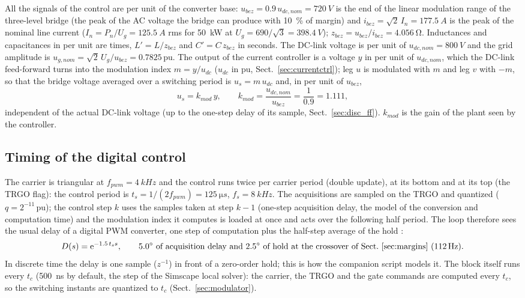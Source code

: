 \documentclass[10pt,a4paper]{scrartcl}
\newcommand{\ts}{t_s}
\newcommand{\tc}{t_c}
\newcommand{\kmod}{k_{mod}}
\newcommand{\ee}{\mathrm{e}}
\newcommand{\pu}{\,\mathrm{pu}}
\begin{document}
\begin{onehalfspace}
All the signals of the control are per unit of the converter base: $u_{bez} = 0.9\,u_{dc,nom} = \SI{720}{V}$ is the end of the linear modulation range of the three-level bridge (the peak of the AC voltage the bridge can produce with \SI{10}{\percent} of margin) and $i_{bez} = \sqrt2\,I_n = \SI{177.5}{A}$ is the peak of the nominal line current ($I_n = P_n/U_g = \SI{125.5}{A}$ rms for \SI{50}{kW} at $U_g = 690/\sqrt3 = \SI{398.4}{V}$); $z_{bez} = u_{bez}/i_{bez} = \SI{4.056}{\ohm}$. Inductances and capacitances in per unit are times, $L' = L/z_{bez}$ and $C' = C\,z_{bez}$ in seconds. The DC-link voltage is per unit of $u_{dc,nom} = \SI{800}{V}$ and the grid amplitude is $u_{g,nom} = \sqrt2\,U_g/u_{bez} = 0.7825\pu$. The output of the current controller is a voltage $y$ in per unit of $u_{dc,nom}$, which the DC-link feed-forward turns into the modulation index $m = y/u_{dc}$ ($u_{dc}$ in pu, Sect.~\ref{sec:currentctrl}); leg $u$ is modulated with $m$ and leg $v$ with $-m$, so that the bridge voltage averaged over a switching period is $u_s = m\,u_{dc}$ and, in per unit of $u_{bez}$,
\begin{equation}
u_s = \kmod\,y, \qquad \kmod = \frac{u_{dc,nom}}{u_{bez}} = \frac{1}{0.9} = 1.111,
\label{eq:kmod}
\end{equation}
independent of the actual DC-link voltage (up to the one-step delay of its sample, Sect.~\ref{sec:disc_ff}). $\kmod$ is the gain of the plant seen by the controller.

\subsection{Timing of the digital control}
\label{sec:timing}

The carrier is triangular at $f_{pwm} = \SI{4}{kHz}$ and the control runs twice per carrier period (double update), at its bottom and at its top (the TRGO flag): the control period is $\ts = 1/(2f_{pwm}) = \SI{125}{\micro s}$, $f_s = \SI{8}{kHz}$. The acquisitions are sampled on the TRGO and quantized ($q = 2^{-11}\pu$); the control step $k$ uses the samples taken at step $k - 1$ (one-step acquisition delay, the model of the conversion and computation time) and the modulation index it computes is loaded at once and acts over the following half period. The loop therefore sees the usual delay of a digital PWM converter, one step of computation plus the half-step average of the hold \cite{buso2015}:
\begin{equation}
D(s) = \ee^{-1.5\,\ts s}, \qquad \text{\SI{5.0}{\degree} of acquisition delay and \SI{2.5}{\degree} of hold at the crossover of Sect.~\ref{sec:margins} (\SI{112}{Hz}).}
\label{eq:delay}
\end{equation}
In discrete time the delay is one sample ($z^{-1}$) in front of a zero-order hold; this is how the companion script models it. The block itself runs every $\tc$ (\SI{500}{ns} by default, the step of the Simscape local solver): the carrier, the TRGO and the gate commands are computed every $\tc$, so the switching instants are quantized to $\tc$ (Sect.~\ref{sec:modulator}).


\end{onehalfspace}
\end{document}

